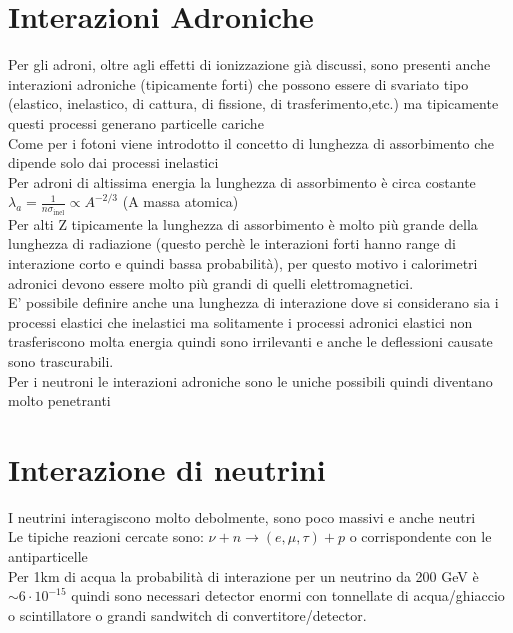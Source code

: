\section{Interazioni Adroniche}
Per gli adroni, oltre agli effetti di ionizzazione già discussi, sono presenti anche interazioni adroniche (tipicamente forti) che possono essere di svariato tipo (elastico, inelastico, di cattura, di fissione, di trasferimento,etc.) ma tipicamente questi processi generano particelle cariche
\\
Come per i fotoni viene introdotto il concetto di lunghezza di assorbimento che dipende solo dai processi inelastici
\\
Per adroni di altissima energia la lunghezza di assorbimento è circa costante $\lambda_a=\frac{1}{n\sigma_{\text{inel}}} \propto A^{-2/3}$ (A massa atomica)
\\
Per alti Z tipicamente la lunghezza di assorbimento è molto più grande della lunghezza di radiazione (questo perchè le interazioni forti hanno range di interazione corto e quindi bassa probabilità), per questo motivo i calorimetri adronici devono essere molto più grandi di quelli elettromagnetici.
\\
E' possibile definire anche una lunghezza di interazione dove si considerano sia i processi elastici che inelastici ma solitamente i processi adronici elastici non trasferiscono molta energia quindi sono irrilevanti e anche le deflessioni causate sono trascurabili.
\\
Per i neutroni le interazioni adroniche sono le uniche possibili quindi diventano molto penetranti
\section{Interazione di neutrini}
I neutrini interagiscono molto debolmente, sono poco massivi e anche neutri
\\
Le tipiche reazioni cercate sono:
$\nu+n \to (e,\mu,\tau) +p$ o corrispondente con le antiparticelle
\\
Per 1km di acqua la probabilità di interazione per un neutrino da 200 GeV è $\sim 6 \cdot 10^{-15}$ quindi sono necessari detector enormi con tonnellate di acqua/ghiaccio o scintillatore o grandi sandwitch di convertitore/detector.

